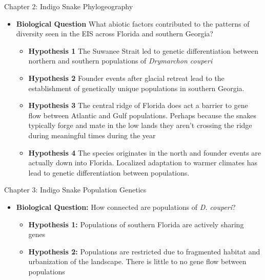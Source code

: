 \documentclass[10pt,aspectratio=169]{beamer}
\begin{document}
\begin{frame}{Chapter 2: Indigo Snake Phylogeography}
      \begin{itemize}
        \item \textbf{Biological Question} What abiotic factors contributed to the patterns of diversity seen in the EIS across Florida and southern Georgia?
        \begin{itemize}
        
        \item \textbf{Hypothesis 1} The Suwanee Strait led to genetic differentiation between northern and southern populations of \textit{Drymarchon couperi}
        \item \textbf{Hypothesis 2} Founder events after glacial retreat lead to the     establishment of genetically unique populations in southern Georgia. 
        \item \textbf{Hypothesis 3} The central ridge of Florida does act a barrier to gene flow between Atlantic and Gulf populations. Perhaps because the snakes typically forge and mate in the low lands they aren't crossing the ridge during meaningful times during the year
        \item \textbf{Hypothesis 4} The species originates in the north and founder events are actually down into Florida. Localized adaptation to warmer climates has lead to genetic differentiation between populations. 
      \end{itemize}
    \end{itemize}  
\end{frame}

\begin{frame}{Chapter 3: Indigo Snake Population Genetics}
      \begin{itemize}
       \item \textbf{Biological Question:} How connected are populations of \textit{D. couperi}?
        \begin{itemize}
          \item \textbf{Hypothesis 1:} Populations of southern Florida are actively sharing genes
          \item \textbf{Hypothesis 2:} Populations are restricted due to fragmented habitat and urbanization of the landscape. There is little to no gene flow between populations 
        \end{itemize}
      \end{itemize}  
\end{frame}
\end{document}
